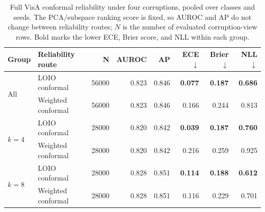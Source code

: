 \begin{table}[pos=t]
\centering
\caption{Full VisA conformal reliability under four corruptions, pooled over classes and seeds. The PCA/subspace ranking score is fixed, so AUROC and AP do not change between reliability routes; $N$ is the number of evaluated corruption-view rows. Bold marks the lower ECE, Brier score, and NLL within each group.}
\label{tab:visa-full-conformal}
\footnotesize
\begin{tabular}{llrrrrrr}
\toprule
Group & Reliability route & N & AUROC & AP & ECE $\downarrow$ & Brier $\downarrow$ & NLL $\downarrow$ \\
\midrule
\multirow{2}{*}{All} & LOIO conformal & 56000 & 0.823 & 0.846 & \textbf{0.077} & \textbf{0.187} & \textbf{0.686} \\
 & Weighted conformal & 56000 & 0.823 & 0.846 & 0.166 & 0.244 & 0.813 \\
\midrule
\multirow{2}{*}{$k{=}4$} & LOIO conformal & 28000 & 0.820 & 0.842 & \textbf{0.039} & \textbf{0.187} & \textbf{0.760} \\
 & Weighted conformal & 28000 & 0.820 & 0.842 & 0.216 & 0.259 & 0.925 \\
\midrule
\multirow{2}{*}{$k{=}8$} & LOIO conformal & 28000 & 0.828 & 0.851 & \textbf{0.114} & \textbf{0.188} & \textbf{0.612} \\
 & Weighted conformal & 28000 & 0.828 & 0.851 & 0.116 & 0.229 & 0.701 \\
\bottomrule
\end{tabular}
\end{table}
